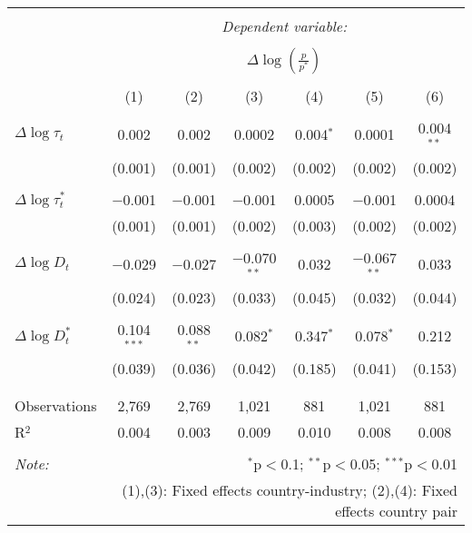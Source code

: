 
\begin{tabular}{@{\extracolsep{5pt}}lcccccc} 
\\[-1.8ex]\hline 
\hline \\[-1.8ex] 
 & \multicolumn{6}{c}{\textit{Dependent variable:}} \\ 
\cline{2-7} 
\\[-1.8ex] & \multicolumn{6}{c}{$\Delta \log \left(\frac{p}{p^*} \right)$} \\ 
\\[-1.8ex] & (1) & (2) & (3) & (4) & (5) & (6)\\ 
\hline \\[-1.8ex] 
 $\Delta \log \tau_t$ & 0.002 & 0.002 & 0.0002 & 0.004$^{*}$ & 0.0001 & 0.004$^{**}$ \\ 
  & (0.001) & (0.001) & (0.002) & (0.002) & (0.002) & (0.002) \\ 
  & & & & & & \\ 
 $\Delta \log \tau_t^*$ & $-$0.001 & $-$0.001 & $-$0.001 & 0.0005 & $-$0.001 & 0.0004 \\ 
  & (0.001) & (0.001) & (0.002) & (0.003) & (0.002) & (0.002) \\ 
  & & & & & & \\ 
 $\Delta \log D_t$ & $-$0.029 & $-$0.027 & $-$0.070$^{**}$ & 0.032 & $-$0.067$^{**}$ & 0.033 \\ 
  & (0.024) & (0.023) & (0.033) & (0.045) & (0.032) & (0.044) \\ 
  & & & & & & \\ 
 $\Delta \log D_t^*$ & 0.104$^{***}$ & 0.088$^{**}$ & 0.082$^{*}$ & 0.347$^{*}$ & 0.078$^{*}$ & 0.212 \\ 
  & (0.039) & (0.036) & (0.042) & (0.185) & (0.041) & (0.153) \\ 
  & & & & & & \\ 
\hline \\[-1.8ex] 
Observations & 2,769 & 2,769 & 1,021 & 881 & 1,021 & 881 \\ 
R$^{2}$ & 0.004 & 0.003 & 0.009 & 0.010 & 0.008 & 0.008 \\ 
\hline 
\hline \\[-1.8ex] 
\textit{Note:}  & \multicolumn{6}{r}{$^{*}$p$<$0.1; $^{**}$p$<$0.05; $^{***}$p$<$0.01} \\ 
 & \multicolumn{6}{r}{(1),(3): Fixed effects country-industry; (2),(4): Fixed effects country pair} \\ 
\end{tabular} 
